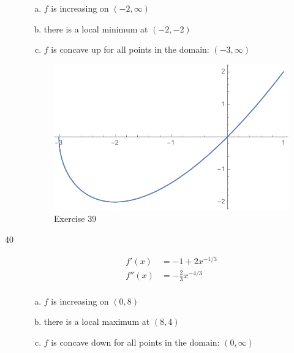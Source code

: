 \documentclass[letterpaper, landscape]{exam}
\begin{document}
\begin{description}
      \begin{enumerate}[(a)]
        \item $f$ is increasing on $(-2, \infty)$

        \item there is a local minimum at $(-2, -2)$ 

        \item $f$ is concave up for all points in the domain: $(-3, \infty)$

      \end{enumerate}

      \begin{figure}[H]
        \centering
        \includegraphics[scale = 0.6]{ex39.pdf}
        \caption{Exercise 39}
        \label{fig:ex39}
      \end{figure}

    \newpage

    \item[40]
      \begin{align*}
        f'(x)  & = -1 + 2x^{-1/3} \\
        f''(x) & = -\frac{2}{3} x^{-4/3} \\
      \end{align*}

      \begin{enumerate}[(a)]
        \item $f$ is increasing on $(0, 8)$

        \item there is a local maximum at $(8, 4)$ 

        \item $f$ is concave down for all points in the domain: $(0, \infty)$

      \end{enumerate}


\end{description}
\end{document}

